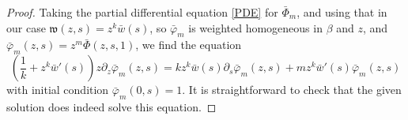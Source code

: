 \documentclass[10pt,a4paper,oneside,no-math,reqno]{amsart}%
\theoremstyle{plain}
\theoremstyle{definition}
\theoremstyle{remark}
\numberwithin{equation}{section}
\renewcommand{\phi}{\varphi}
\newcommand{\mf}[1]{\mathfrak{#1}}
\newcommand{\mc}[1]{\mathcal{#1}}
\newcommand{\1}{\mathds{1}}
\newcommand{\<}{\langle}
\renewcommand{\>}{\rangle}
\newcommand{\del}{\partial}
\begin{document}
\begin{proof}
	Taking the partial differential equation \eqref{PDE} for $ \bar{\Phi}_m$, and using that in our case $ \mf{w} (z,s) = z^k \bar{w}(s)$, so $ \bar{\phi}_m$ is weighted homogeneous in $ \beta $ and $z$, and $ \bar{\phi}_m (z,s) = z^m \bar{\Phi}(z,s,1) $, we find the equation
	\begin{equation}\label{PDEforphibar}
		(\frac{1}{k} + z^k \bar{w}'(s)) z \del_z \bar{\phi}_m (z,s)
		=
		k z^k \bar{w}(s) \del_s \bar{\phi}_m (z,s) + m z^k \bar{w}'(s) \bar{\phi}_m (z,s) 
	\end{equation}
	with initial condition $ \bar{\phi}_m (0,s) = 1$. It is straightforward to check that the given solution does indeed solve this equation.

\end{proof}
\end{document}
